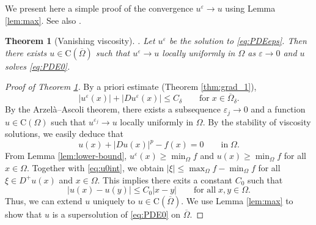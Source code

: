 \documentclass[12pt,reqno]{amsart}
\numberwithin{figure}{section}
\theoremstyle{plain}
\newtheorem{thm}{Theorem}[section]
\theoremstyle{remark}
\numberwithin{equation}{section}
\newcommand{\rmC}{\mathrm{C}}
\begin{document}
We present here a simple proof of the convergence $u^\varepsilon \to u$ using Lemma \ref{lem:max}. See also \cite[Theorem VII.3]{Capuzzo-Dolcetta1990}.
\begin{thm}[Vanishing viscosity]\label{thm:qual}. Let $u^\varepsilon$ be the solution to \eqref{eq:PDEeps}. Then there exists $u \in \mathrm{C}(\overline{\Omega})$ such that $u^\varepsilon \rightarrow u$ locally uniformly in $\Omega$ as $\varepsilon\rightarrow 0$ and $u$ solves \eqref{eq:PDE0}.
\end{thm}

\begin{proof}[Proof of Theorem \ref{thm:qual}] By a priori estimate (Theorem \ref{thm:grad_1}), 
\begin{equation}\label{e:priorie_eps}
    |u^\varepsilon(x)| + |Du^\varepsilon(x)| \leq C_\delta \qquad\text{for}\;x\in \overline{\Omega}_\delta.
\end{equation}
By the Arzel\`a--Ascoli theorem, there exists a subsequence $\varepsilon_j\to 0$ and a function $u\in \rmC(\Omega)$ such that $u^{\varepsilon_j}\to u$ locally uniformly in $\Omega$. By the stability of viscosity solutions, we easily deduce that 
\begin{equation}\label{eq:u0int}
     u(x) + |Du(x)|^p - f(x) = 0 \qquad\text{in}\;\Omega.
\end{equation}
From Lemma \ref{lem:lower-bound}, $  u^\varepsilon(x)\geq \min_{\Omega} f$ and  $  u(x)\geq \min_{\Omega} f$ for all $x\in \Omega$. Together with \eqref{eq:u0int}, we obtain $|\xi|\leq \max_\Omega f - \min_\Omega f$ for all $\xi\in D^+u(x)$ and $x\in \Omega$. This implies there exits a constant $C_0$ such that
\begin{equation}\label{e:C0}
    |u(x) - u(y)| \leq C_0|x-y| \qquad\text{for all}\;x,y\in \Omega.
\end{equation}
Thus, we can extend $u$ uniquely to $u\in \rmC(\overline{\Omega})$. We use Lemma \ref{lem:max} to show that $u$ is a supersolution of \eqref{eq:PDE0} on $\overline{\Omega}$.


\end{proof}
\end{document}
